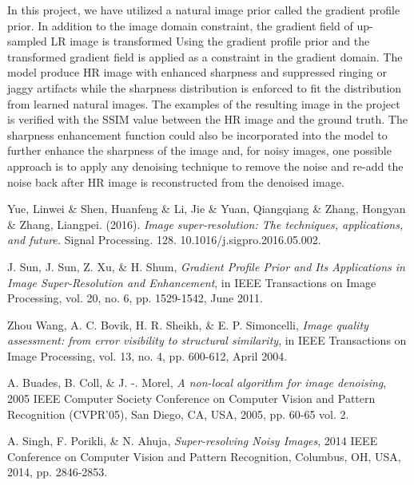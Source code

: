 \documentclass[a4paper,11pt]{article}
\begin{document}
In this project, we have utilized a natural image prior called the gradient profile prior. In addition to the image domain constraint, the gradient field of up-sampled LR image is transformed Using the gradient profile prior and the transformed gradient field is applied as a constraint in the gradient domain. The model produce HR image with enhanced sharpness and suppressed ringing or jaggy artifacts while the sharpness distribution is enforced to fit the distribution from learned natural images. The examples of the resulting image in the project is verified with the SSIM value between the HR image and the ground truth. The sharpness enhancement function could also be incorporated into the model to further enhance the sharpness of the image and, for noisy images, one possible approach is to apply any denoising technique to remove the noise and re-add the noise back after HR image is reconstructed from the denoised image.

\begin{thebibliography}{10}

 {\sc Yue, Linwei \& Shen, Huanfeng \& Li, Jie \& Yuan, Qiangqiang \& Zhang, Hongyan \& Zhang, Liangpei.} (2016). {\em Image super-resolution: The techniques, applications, and future.} Signal Processing. 128. 10.1016/j.sigpro.2016.05.002. 

 {\sc J. Sun, J. Sun, Z. Xu, \& H. Shum}, {\em Gradient Profile Prior and Its Applications in Image Super-Resolution and Enhancement}, in IEEE Transactions on Image Processing, vol. 20, no. 6, pp. 1529-1542, June 2011.

 {\sc Zhou Wang, A. C. Bovik, H. R. Sheikh, \& E. P. Simoncelli}, {\em Image quality assessment: from error visibility to structural similarity}, in IEEE Transactions on Image Processing, vol. 13, no. 4, pp. 600-612, April 2004.

 {\sc A. Buades, B. Coll, \& J. -. Morel}, {\em A non-local algorithm for image denoising}, 2005 IEEE Computer Society Conference on Computer Vision and Pattern Recognition (CVPR'05), San Diego, CA, USA, 2005, pp. 60-65 vol. 2.

 {\sc A. Singh, F. Porikli, \& N. Ahuja}, {\em Super-resolving Noisy Images}, 2014 IEEE Conference on Computer Vision and Pattern Recognition, Columbus, OH, USA, 2014, pp. 2846-2853.

\end{thebibliography}
\end{document}
